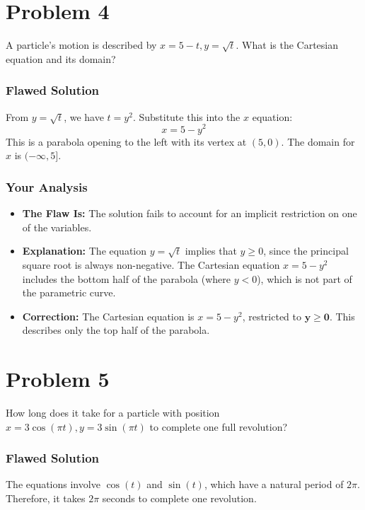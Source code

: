 \documentclass{article}
\begin{document}
\section{Problem 4}
A particle's motion is described by $x = 5-t, y = \sqrt{t}$. What is the Cartesian equation and its domain?

\subsubsection*{Flawed Solution}
From $y = \sqrt{t}$, we have $t = y^2$.
Substitute this into the $x$ equation:
\[ x = 5 - y^2 \]
This is a parabola opening to the left with its vertex at $(5, 0)$. The domain for $x$ is $(-\infty, 5]$.

\subsubsection*{Your Analysis}
\begin{itemize}
    \item \textbf{The Flaw Is:} The solution fails to account for an implicit restriction on one of the variables.
    \item \textbf{Explanation:} The equation $y = \sqrt{t}$ implies that $y \ge 0$, since the principal square root is always non-negative. The Cartesian equation $x=5-y^2$ includes the bottom half of the parabola (where $y < 0$), which is not part of the parametric curve.
    \item \textbf{Correction:} The Cartesian equation is $x = 5-y^2$, restricted to $\boldsymbol{y \ge 0}$. This describes only the top half of the parabola.
\end{itemize}

\section{Problem 5}
How long does it take for a particle with position $x=3\cos(\pi t), y=3\sin(\pi t)$ to complete one full revolution?

\subsubsection*{Flawed Solution}
The equations involve $\cos(t)$ and $\sin(t)$, which have a natural period of $2\pi$. Therefore, it takes $2\pi$ seconds to complete one revolution.
\end{document}
